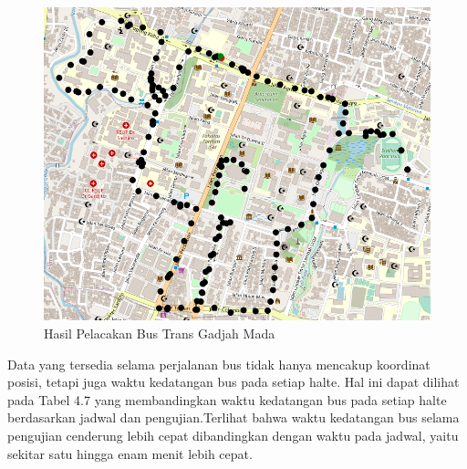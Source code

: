 \begin{figure}[H]
	\centering
	\includegraphics[width=12cm]{contents/chapter-4/pengujian-bergerak/tracked-route.png}
	\caption{Hasil Pelacakan Bus Trans Gadjah Mada}
	\label{Fig: moving-tracked-route}
\end{figure}

Data yang tersedia selama perjalanan bus tidak hanya mencakup koordinat posisi, tetapi juga waktu kedatangan bus pada setiap halte. Hal ini dapat dilihat pada Tabel 4.7 yang membandingkan waktu kedatangan bus pada setiap halte berdasarkan jadwal dan pengujian.Terlihat bahwa waktu kedatangan bus selama pengujian cenderung lebih cepat dibandingkan dengan waktu pada jadwal, yaitu sekitar satu hingga enam menit lebih cepat.

